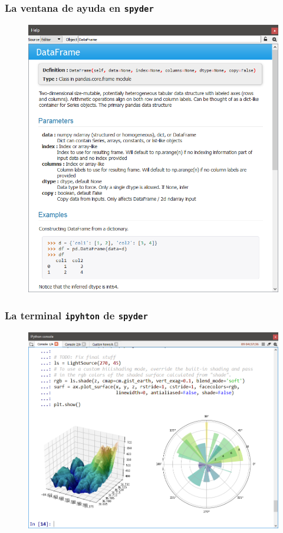 \begin{frame}[fragile]
\frametitle{La ventana de ayuda en \texttt{spyder}}
\begin{figure}
    \centering
    \includegraphics[scale=0.25]{spyder_editor_04.png}
\end{figure}
\end{frame}
\begin{frame}[fragile]
\frametitle{La terminal \texttt{ipyhton} de  \texttt{spyder}}
\begin{figure}
    \centering
    \includegraphics[scale=0.25]{spyder_editor_05.png}
\end{figure}
\end{frame}
